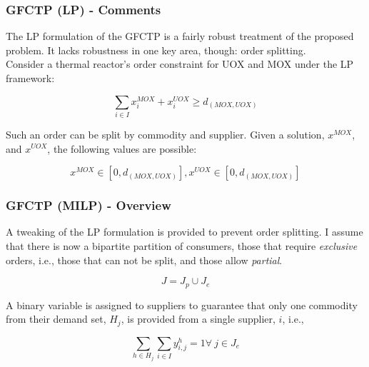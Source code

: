 \begin{frame}[ctb!]
  \frametitle{GFCTP (LP) - Comments} 

  The LP formulation of the GFCTP is a fairly robust treatment of the proposed
  problem. It lacks robustness in one key area, though: order splitting.\\

  Consider a thermal reactor's order constraint for UOX and MOX under the LP
  framework:

  \begin{equation}
    \sum_{i \in I} x_{i}^{MOX} + x_{i}^{UOX} \geq d_({MOX,UOX})
  \end{equation} 

  Such an order can be split by commodity and supplier. Given a solution,
  $x^{MOX}$, and $x^{UOX}$, the following values are possible:

  \begin{equation}
    x^{MOX} \in [0, d_({MOX,UOX})],
    x^{UOX} \in [0, d_({MOX,UOX})]
  \end{equation} 

\end{frame}

\begin{frame}[ctb!]
  \frametitle{GFCTP (MILP) - Overview}

  A tweaking of the LP formulation is provided to prevent order splitting. I
  assume that there is now a bipartite partition of consumers, those that
  require \textit{exclusive} orders, i.e., those that can not be split, and
  those allow \textit{partial}.

  \begin{equation}\label{eqs:consumer-union}
    J = J_{p} \cup J_{e}
  \end{equation}

  A binary variable is assigned to suppliers to guarantee that only one
  commodity from their demand set, $H_j$, is provided from a single supplier,
  $i$, i.e.,

  \begin{equation}
    \sum_{h \in H_j}\sum_{i \in I} y_{i,j}^{h} = 1
    \forall \: j \in J_{e}
  \end{equation}
  
\end{frame}

